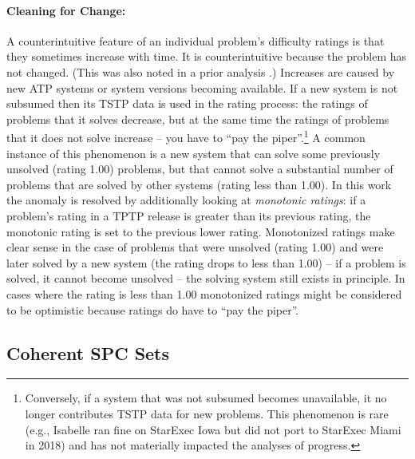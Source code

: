 \documentclass[runningheads]{llncs}
\begin{document}
\paragraph{Cleaning for Change:}
A counterintuitive feature of an individual problem's difficulty ratings is that they sometimes 
increase with time. 
It is counterintuitive because the problem has not changed.
(This was also noted in a prior analysis \cite{Sut17}.)
Increases are caused by new ATP systems or system versions becoming available.
If a new system is not subsumed then its TSTP data is used in the rating process:
the ratings of problems that it solves decrease, but at the same time the ratings of problems that 
it does not solve increase -- you have to ``pay the piper''.\footnote{%
Conversely, if a system that was not subsumed becomes unavailable, it no longer contributes
TSTP data for new problems.
This phenomenon is rare (e.g., Isabelle ran fine on StarExec Iowa but did not port to StarExec 
Miami in 2018) and has not materially impacted the analyses of progress.} 
A common instance of this phenomenon is a new system that can solve some previously unsolved
(rating 1.00) problems, but that cannot solve a substantial number of problems that are solved
by other systems (rating less than 1.00).
In this work the anomaly is resolved by additionally looking at {\em monotonic ratings}:
if a problem's rating in a TPTP release is greater than its previous rating, the monotonic 
rating is set to the previous lower rating.
Monotonized ratings make clear sense in the case of problems that were unsolved (rating 1.00) and 
were later solved by a new system (the rating drops to less than 1.00) -- if a problem is 
solved, it cannot become unsolved -- the solving system still exists in principle.
In cases where the rating is less than 1.00 monotonized ratings might be considered to be 
optimistic because ratings do have to ``pay the piper''.

\subsection{Coherent SPC Sets}
\label{SPCSets}
\end{document}
